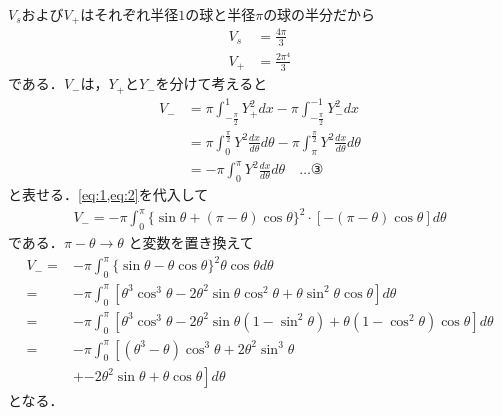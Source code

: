 \documentclass[a4paper,10pt]{ltjsarticle}
\begin{document}
\begin{multicols}{2}
  $V_{s}$および$V_{+}$はそれぞれ半径$1$の球と半径$\pi$の球の半分だから
  \begin{align}
    V_{s} & = \frac{4\pi}{3} \label{eq:8}   \\
    V_{+} & = \frac{2\pi^4}{3} \label{eq:9}
  \end{align}
  である．$V_{-}$は，$Y_{+}$と$Y_{-}$を分けて考えると
  \begin{align*}
    V_{-}
     & = \pi \int_{-\frac{\pi}{2}}^{1} Y_{+}^2 dx - \pi \int_{-\frac{\pi}{2}}^{-1} Y_{-}^2 dx                                        \\
     & = \pi \int_{0}^{\frac{\pi}{2}} Y^2 \frac{dx}{d\theta} d\theta - \pi \int_{\pi}^{\frac{\pi}{2}} Y^2 \frac{dx}{d\theta} d\theta \\
     & = -\pi \int_{0}^{\pi} Y^2 \frac{dx}{d\theta} d\theta  \quad \dots \text{③}
  \end{align*}
  と表せる．\cref{eq:1,eq:2}を代入して
  \begin{align*}
    V_{-} =  -\pi \int_{0}^{\pi} \{ \sin\theta + (\pi - \theta) \cos\theta \}^2 \cdot \left[-(\pi - \theta)\cos\theta\right] d\theta
  \end{align*}
  である．$\pi - \theta \to \theta$ と変数を置き換えて
  \begin{align*}
    V_{-}
    = & -\pi \int_{0}^{\pi} \{ \sin\theta - \theta\cos\theta \}^2 \theta \cos\theta  d\theta                                                      \\
    = & -\pi \int_{0}^{\pi} \left[\theta^3\cos^3\theta -2 \theta^2\sin\theta\cos^2\theta + \theta \sin^2\theta\cos\theta \right]  d\theta         \\
    = & -\pi \int_{0}^{\pi} \left[\theta^3\cos^3\theta -2 \theta^2\sin\theta(1-\sin^2\theta) + \theta (1-\cos^2\theta)\cos\theta \right]  d\theta \\
    = & -\pi \int_{0}^{\pi} \left[\left(\theta^3-\theta\right)\cos^3\theta + 2\theta^2\sin^3\theta \right.                                        \\
      & + \left.-2 \theta^2\sin\theta + \theta \cos\theta \right]  d\theta
  \end{align*}
  となる．


\end{multicols}
\end{document}
